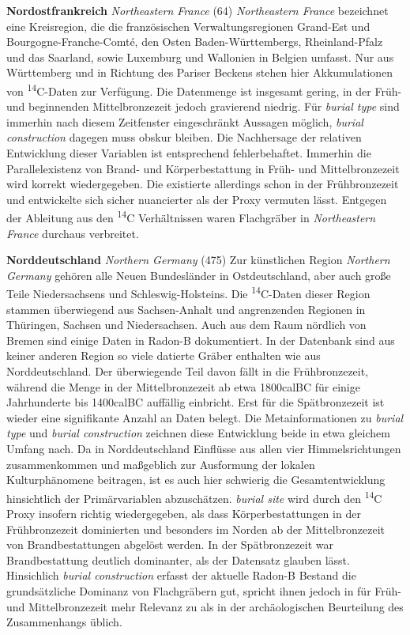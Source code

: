 \documentclass[openany,twoside,twocolumn]{book}
\begin{document}
\textbf{Nordostfrankreich} \emph{Northeastern France} (64) \newline 
\emph{Northeastern France} bezeichnet eine Kreisregion, die die
französischen Verwaltungsregionen Grand-Est und Bourgogne-Franche-Comté,
den Osten Baden-Württembergs, Rheinland-Pfalz und das Saarland, sowie
Luxemburg und Wallonien in Belgien umfasst. Nur aus Württemberg und in
Richtung des Pariser Beckens stehen hier Akkumulationen von
\textsuperscript{14}C-Daten zur Verfügung. Die Datenmenge ist insgesamt
gering, in der Früh- und beginnenden Mittelbronzezeit jedoch gravierend
niedrig. Für \emph{burial type} sind immerhin nach diesem Zeitfenster
eingeschränkt Aussagen möglich, \emph{burial construction} dagegen muss
obskur bleiben. Die Nachhersage der relativen Entwicklung dieser
Variablen ist entsprechend fehlerbehaftet. Immerhin die Parallelexistenz
von Brand- und Körperbestattung in Früh- und Mittelbronzezeit wird
korrekt wiedergegeben. Die existierte allerdings schon in der
Frühbronzezeit und entwickelte sich sicher nuancierter als der Proxy
vermuten lässt. Entgegen der Ableitung aus den \textsuperscript{14}C
Verhältnissen waren Flachgräber in \emph{Northeastern France} durchaus
verbreitet.

\textbf{Norddeutschland} \emph{Northern Germany} (475) \newline  Zur
künstlichen Region \emph{Northern Germany} gehören alle Neuen
Bundesländer in Ostdeutschland, aber auch große Teile Niedersachsens und
Schleswig-Holsteins. Die \textsuperscript{14}C-Daten dieser Region
stammen überwiegend aus Sachsen-Anhalt und angrenzenden Regionen in
Thüringen, Sachsen und Niedersachsen. Auch aus dem Raum nördlich von
Bremen sind einige Daten in Radon-B dokumentiert. In der Datenbank sind
aus keiner anderen Region so viele datierte Gräber enthalten wie aus
Norddeutschland. Der überwiegende Teil davon fällt in die
Frühbronzezeit, während die Menge in der Mittelbronzezeit ab etwa
1800calBC für einige Jahrhunderte bis 1400calBC auffällig einbricht.
Erst für die Spätbronzezeit ist wieder eine signifikante Anzahl an Daten
belegt. Die Metainformationen zu \emph{burial type} und \emph{burial
construction} zeichnen diese Entwicklung beide in etwa gleichem Umfang
nach. Da in Norddeutschland Einflüsse aus allen vier Himmelsrichtungen
zusammenkommen und maßgeblich zur Ausformung der lokalen Kulturphänomene
beitragen, ist es auch hier schwierig die Gesamtentwicklung hinsichtlich
der Primärvariablen abzuschätzen. \emph{burial site} wird durch den
\textsuperscript{14}C Proxy insofern richtig wiedergegeben, als dass
Körperbestattungen in der Frühbronzezeit dominierten und besonders im
Norden ab der Mittelbronzezeit von Brandbestattungen abgelöst werden. In
der Spätbronzezeit war Brandbestattung deutlich dominanter, als der
Datensatz glauben lässt. Hinsichlich \emph{burial construction} erfasst
der aktuelle Radon-B Bestand die grundsätzliche Dominanz von
Flachgräbern gut, spricht ihnen jedoch in für Früh- und Mittelbronzezeit
mehr Relevanz zu als in der archäologischen Beurteilung des
Zusammenhangs üblich.
\end{document}
